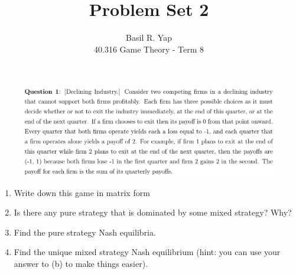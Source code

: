 \documentclass[12pt]{article}
\begin{document}
 
 
\title{Problem Set 2}%
\author{Basil R. Yap\\ %
40.316 Game Theory - Term 8} %
 
\maketitle

\begin{figure}[h!]
\includegraphics[width=\linewidth]{./assets/201806021724.png}
\end{figure}
\begin{enumerate}[label=(\alph*)]
\item Write down this game in matrix form
\item Is there any pure strategy that is dominated by some mixed strategy? Why?
\item Find the pure strategy Nash equilibria.
\item Find the unique mixed strategy Nash equilibrium (hint: you can use your answer to (b) to make things easier).
\end{enumerate}
\end{document}
